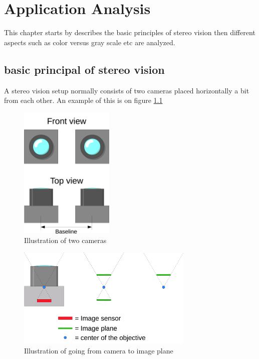 \chapter{Application Analysis} \label{ch:appanalysis}
This chapter starts by describes the basic principles of stereo vision then different aspects such as color versus gray scale etc are analyzed. 

\section{basic principal of stereo vision}
A stereo vision setup normally consists of two cameras placed horizontally a bit from each other. An example of this is on figure \ref{fig:2cams}

\begin{figure}[ht!]
  \centering
  \includegraphics[width=0.4\textwidth]{figures/2_cams_fro_top.jpg}
  \caption{Illustration of two cameras}
  \label{fig:2cams}
\end{figure}

\begin{figure}[ht!]
  \centering
  \includegraphics[width=0.75\textwidth]{figures/cam2imageplane.jpg}
  \caption{Illustration of going from camera to image plane}
  \label{fig:cam2imgplane}
\end{figure}

